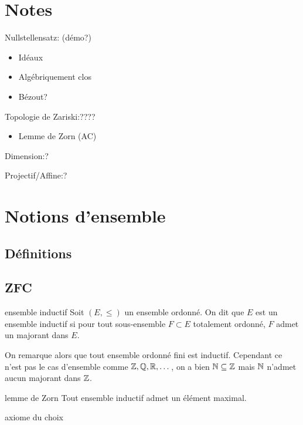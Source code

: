\section{Notes}

Nullstellensatz: (démo?)
\begin{itemize}
    \item Idéaux
    \item Algébriquement clos
    \item Bézout?
\end{itemize}
\mbox{}

Topologie de Zariski:????
\begin{itemize}
    \item Lemme de Zorn (AC)
\end{itemize}
\mbox{}

Dimension:?
\mbox{}

Projectif/Affine:?
\mbox{}




\section{Notions d'ensemble}

\subsection{Définitions}

\subsection{ZFC}

\begin{definition}{ensemble inductif}{}
    Soit $(E, \leqslant)$ un ensemble ordonné. On dit que $E$ est un ensemble inductif si pour tout sous-ensemble
    $F \subset E$ totalement ordonné, $F$ admet un majorant dans $E$.
\end{definition}

On remarque alors que tout ensemble ordonné fini est inductif. 
Cependant ce n'est pas le cas d'ensemble comme $\mathbb{Z}, \mathbb{Q}, \mathbb{R}, \dots$,
on a bien $\mathbb{N} \subseteq \mathbb{Z}$ mais $\mathbb{N}$ n'admet aucun majorant dans $\mathbb{Z}$.

\begin{theorem}{lemme de Zorn}{}
    Tout ensemble inductif admet un élément maximal.
\end{theorem}

\begin{theorem}{axiome du choix}{}
    
\end{theorem}

